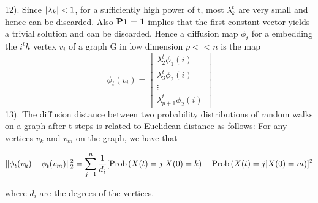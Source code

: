 12). Since $\lvert\lambda_{k}\rvert < 1$, for a sufficiently high power of t,
most $\lambda_{k}^{t}$ are very small and hence can be discarded.
Also $\textbf{P}\boldsymbol{1} = \boldsymbol{1}$ implies that the first constant vector
yields a trivial solution and can be discarded.
Hence a diffusion map $\phi_{t}$ for a embedding the $i^th$ vertex $v_{i}$ of a graph  G in  low dimension
$p << n$ is the map $$\phi_{t}(v_{i}) = \begin{bmatrix}
         \lambda_{2}^{t}\phi_{1}(i)\\
         \lambda_{3}^{t}\phi_{2}(i)\\
         \vdots\\
         \lambda_{p+1}^{t}\phi_{2}(i)
        \end{bmatrix} $$
13). The diffusion distance between two probability distributions of random
walks on a graph after t steps is related to Euclidean distance as follows:
For any vertices $v_{k}$ and $v_{m}$ on the graph, we have that

\begin{equation}\label{diffusionDistance}
\lVert\phi_{t}(v_k) - \phi_{t}(v_m)\rVert_{2}^{2} = 
\displaystyle \sum_{j=1}^{n} \frac{1}{d_{i}} 
[ \text{Prob}\left( X(t) = j | X(0) = k \right) -  \text{Prob}\left( X(t) = j | X(0) = m \right) ]^{2}
\end{equation}

where $d_{i}$ are the degrees of the vertices.\\



































